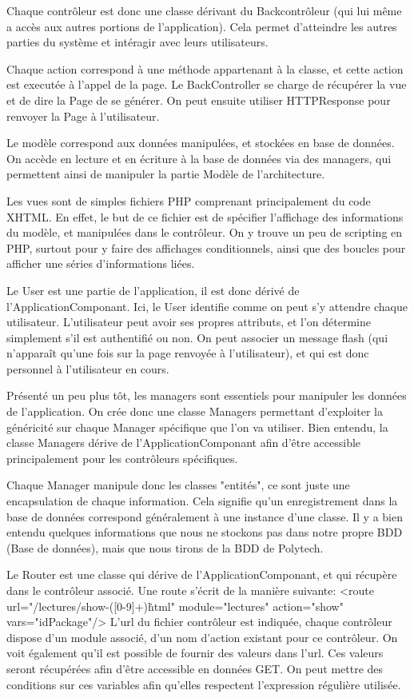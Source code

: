 Chaque contrôleur est donc une classe dérivant du Backcontrôleur (qui lui même a accès aux autres portions de l'application).
Cela permet d'atteindre les autres parties du système et intéragir avec leurs utilisateurs.

Chaque action correspond à une méthode appartenant à la classe, et cette action est executée à l'appel de la page.
Le BackController se charge de récupérer la vue et de dire la Page de se générer. On peut ensuite utiliser HTTPResponse pour
renvoyer la Page à l'utilisateur.

Le modèle correspond aux données manipulées, et stockées en base de données. On accède en lecture et en écriture à la base de données
via des managers, qui permettent ainsi de manipuler la partie Modèle de l'architecture.

Les vues sont de simples fichiers PHP comprenant principalement du code XHTML. En effet, le but de ce fichier est de spécifier
l'affichage des informations du modèle, et manipulées dans le contrôleur. On y trouve un peu de scripting en PHP, surtout
pour y faire des affichages conditionnels, ainsi que des boucles pour afficher une séries d'informations liées.

Le User est une partie de l'application, il est donc dérivé de l'ApplicationComponant. Ici, le User identifie comme on peut
s'y attendre chaque utilisateur. L'utilisateur peut avoir ses propres attributs, et l'on détermine simplement s'il est authentifié
ou non. On peut associer un message flash (qui n'apparaît qu'une fois sur la page renvoyée à l'utilisateur), et qui est donc personnel
à l'utilisateur en cours.

Présenté un peu plus tôt, les managers sont essentiels pour manipuler les données de l'application. On crée donc une classe
Managers permettant d'exploiter la généricité sur chaque Manager spécifique que l'on va utiliser. Bien entendu, la classe
Managers dérive de l'ApplicationComponant afin d'être accessible principalement pour les contrôleurs spécifiques.

Chaque Manager manipule donc les classes "entités", ce sont juste une encapsulation de chaque information. Cela signifie
qu'un enregistrement dans la base de données correspond généralement à une instance d'une classe. Il y a bien entendu quelques
informations que nous ne stockons pas dans notre propre BDD (Base de données), mais que nous tirons de la BDD de Polytech.

Le Router est une classe qui dérive de l'ApplicationComponant, et qui récupère dans le contrôleur associé.
Une route s'écrit de la manière suivante:
<route url="/lectures/show-([0-9]+)\.html" module="lectures" action="show" vars="idPackage"/>
L'url du fichier contrôleur est indiquée, chaque contrôleur dispose d'un module associé, d'un nom d'action existant pour ce
contrôleur. On voit également qu'il est possible de fournir des valeurs dans l'url. Ces valeurs seront récupérées afin
d'être accessible en données GET. On peut mettre des conditions sur ces variables afin qu'elles respectent l'expression régulière
utilisée.

